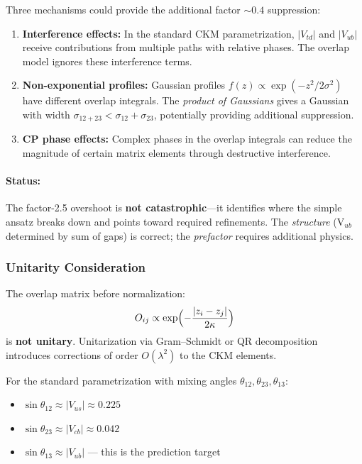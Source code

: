 Three mechanisms could provide the additional factor $\sim 0.4$ suppression:

\begin{enumerate}
    \item \textbf{Interference effects:}
          In the standard CKM parametrization, $|V_{td}|$ and $|V_{ub}|$ receive
          contributions from multiple paths with relative phases. The overlap
          model ignores these interference terms.

    \item \textbf{Non-exponential profiles:}
          Gaussian profiles $f(z) \propto \exp(-z^2/2\sigma^2)$ have different
          overlap integrals. The \emph{product of Gaussians} gives a Gaussian
          with width $\sigma_{12+23} < \sigma_{12} + \sigma_{23}$, potentially
          providing additional suppression.

    \item \textbf{CP phase effects:}
          Complex phases in the overlap integrals can reduce the magnitude of
          certain matrix elements through destructive interference.
\end{enumerate}

\paragraph{Status:}
The factor-2.5 overshoot is \textbf{not catastrophic}---it identifies where
the simple ansatz breaks down and points toward required refinements. The
\emph{structure} (V$_{ub}$ determined by sum of gaps) is correct; the
\emph{prefactor} requires additional physics.

\subsubsection{Unitarity Consideration}

The overlap matrix before normalization:
\begin{equation}
    O_{ij} \propto \exp\Bigl(-\frac{|z_i - z_j|}{2\kappa}\Bigr)
    \label{eq:ch7_overlap_matrix}
\end{equation}
is \textbf{not unitary}. Unitarization via Gram--Schmidt or QR decomposition
introduces corrections of order $O(\lambda^2)$ to the CKM elements.

For the standard parametrization with mixing angles $\theta_{12}, \theta_{23}, \theta_{13}$:
\begin{itemize}[nosep]
    \item $\sin\theta_{12} \approx |V_{us}| \approx 0.225$ \tagCal{}
    \item $\sin\theta_{23} \approx |V_{cb}| \approx 0.042$ \tagCal{}
    \item $\sin\theta_{13} \approx |V_{ub}|$ --- this is the prediction target
\end{itemize}

